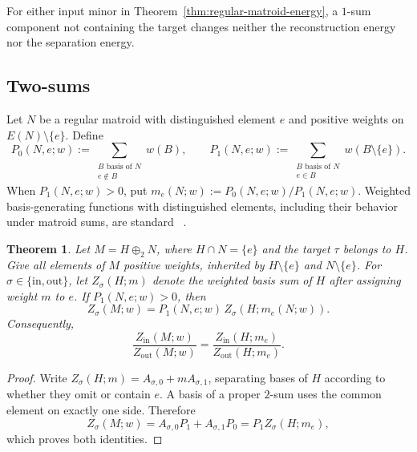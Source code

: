 \documentclass[11pt]{article}
\numberwithin{equation}{section}
\newtheorem{theorem}[definition]{Theorem}
\theoremstyle{remark}
\begin{document}
For either input minor in Theorem~\ref{thm:regular-matroid-energy}, a
$1$-sum component not containing the target changes neither the
reconstruction energy nor the separation energy.

\subsection{Two-sums}
\label{subsec:seymour-two-sum}

Let $N$ be a regular matroid with distinguished element $e$ and positive
weights on $E(N)\setminus\{e\}$. Define
\begin{equation}
    P_0(N,e;w)
    :=\sum_{\substack{B\text{ basis of }N\\ e\notin B}}w(B),
    \qquad
    P_1(N,e;w)
    :=\sum_{\substack{B\text{ basis of }N\\ e\in B}}
        w(B\setminus\{e\}).
    \label{eq:seymour-two-sum-P}
\end{equation}
When $P_1(N,e;w)>0$, put
$m_e(N;w):=P_0(N,e;w)/P_1(N,e;w)$.
Weighted basis-generating functions with distinguished elements, including
their behavior under matroid sums, are standard
~\cite{Chaiken1989PortedMatroid,Chaiken2006PortedTutte}.

\begin{theorem}
\label{thm:seymour-two-sum}
Let $M=H\oplus_2N$, where $H\cap N=\{e\}$ and the target $\tau$ belongs to
$H$. Give all elements of $M$ positive weights, inherited by
$H\setminus\{e\}$ and $N\setminus\{e\}$. For
$\sigma\in\{\mathrm{in},\mathrm{out}\}$, let $Z_\sigma(H;m)$ denote the
weighted basis sum of $H$ after assigning weight $m$ to $e$. If
$P_1(N,e;w)>0$, then
\begin{equation}
    Z_\sigma(M;w)
    =P_1(N,e;w)\,
      Z_\sigma\!\left(H;m_e(N;w)\right).
    \label{eq:seymour-two-sum-factorization}
\end{equation}
Consequently,
\begin{equation}
    \frac{Z_{\mathrm{in}}(M;w)}{Z_{\mathrm{out}}(M;w)}
    =
    \frac{Z_{\mathrm{in}}(H;m_e)}{Z_{\mathrm{out}}(H;m_e)}.
    \label{eq:seymour-two-sum-ratio}
\end{equation}
\end{theorem}

\begin{proof}
Write $Z_\sigma(H;m)=A_{\sigma,0}+mA_{\sigma,1}$, separating bases of $H$
according to whether they omit or contain $e$. A basis of a proper $2$-sum
uses the common element on exactly one side. Therefore
\begin{equation}
    Z_\sigma(M;w)
    =A_{\sigma,0}P_1+A_{\sigma,1}P_0
    =P_1Z_\sigma(H;m_e),
\end{equation}
which proves both identities.
\end{proof}
\end{document}
